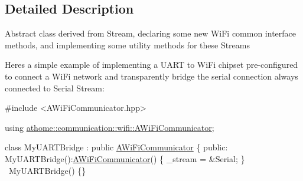 \subsection{Detailed Description}
Abstract class derived from Stream, declaring some new Wi\+Fi common interface methods, and implementing some utility methods for these {\ttfamily Stream}s

Here\textquotesingle{}s a simple example of implementing a U\+A\+RT to Wi\+Fi chipset pre-\/configured to connect a Wi\+Fi network and transparently bridge the serial connection always connected to Serial Stream\+:


\begin{DoxyCode}
\textcolor{preprocessor}{#include <AWiFiCommunicator.hpp>}

\textcolor{keyword}{using} \mbox{\hyperlink{classathome_1_1communication_1_1wifi_1_1_a_wi_fi_communicator}{athome::communication::wifi::AWiFiCommunicator}};

\textcolor{keyword}{class }MyUARTBridge : \textcolor{keyword}{public} \mbox{\hyperlink{classathome_1_1communication_1_1wifi_1_1_a_wi_fi_communicator_a0098148fe8d0eeee99b7f8f72a72a900}{AWiFiCommunicator}} \{
  \textcolor{keyword}{public}:
    MyUARTBridge():\mbox{\hyperlink{classathome_1_1communication_1_1wifi_1_1_a_wi_fi_communicator_a0098148fe8d0eeee99b7f8f72a72a900}{AWiFiCommunicator}}() \{
      \_stream = &Serial;
    \}
    ~MyUARTBridge() \{\}


\end{DoxyCode}
